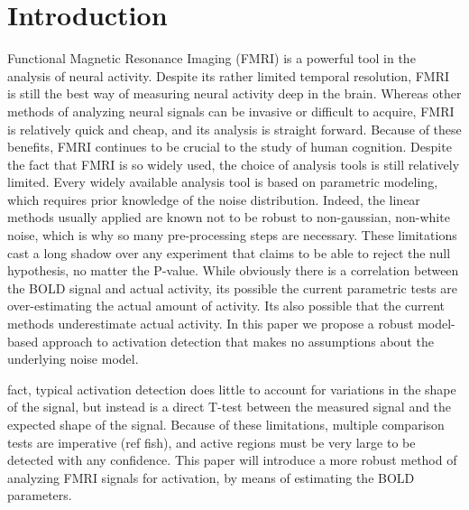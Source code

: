 \documentclass{article}
\begin{document}
\section*{Introduction}
Functional Magnetic Resonance Imaging (FMRI) is a powerful tool in the analysis
of neural activity. Despite its rather limited temporal resolution, FMRI is still
the best way of measuring neural activity deep in the brain. 
Whereas other methods
of analyzing neural signals can be invasive or difficult to acquire, 
FMRI is relatively quick and cheap, and its analysis is straight forward.
Because of these benefits, FMRI continues to be crucial to the study of human 
cognition. Despite the fact that FMRI is so widely used,
the choice of analysis tools is still relatively limited. Every widely
available analysis tool is based on parametric modeling, which requires
prior knowledge of the noise distribution. Indeed, the linear methods
usually applied are known not to be robust to non-gaussian, non-white
noise, which is why so many pre-processing steps are necessary.
These limitations cast a long shadow over any experiment that claims to be
able to reject the null hypothesis, no matter the P-value. While obviously
there is a correlation between the BOLD signal and actual activity, its
possible the current parametric tests are over-estimating the actual amount
of activity. Its also possible that the current methods underestimate
actual activity. In this paper we propose a robust model-based approach to 
activation detection that makes no assumptions about the underlying noise
model.


fact, typical activation detection does little to account for variations
in the shape of the signal, but instead is a direct T-test between the measured signal
and the expected shape of the signal. Because of these limitations,
multiple comparison tests are imperative (ref fish), and active regions
must be very large to be detected with any confidence. This paper
will introduce a more robust method of analyzing FMRI signals for 
activation, by means of estimating the BOLD parameters.
\end{document}
